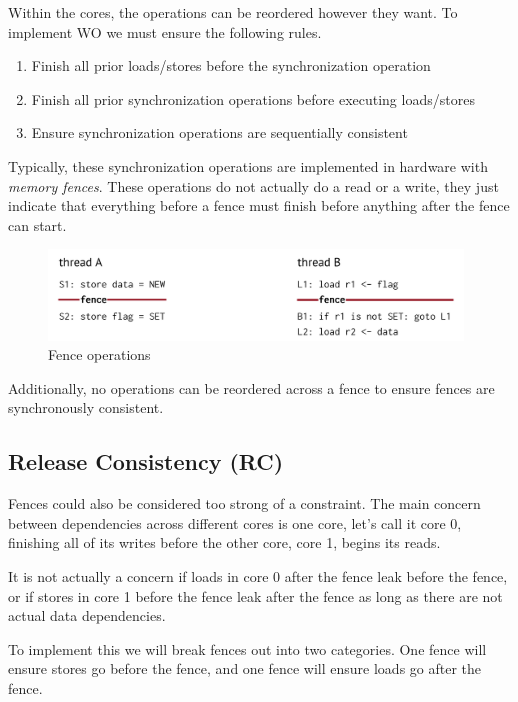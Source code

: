 \documentclass{article}
\begin{document}
Within the cores, the operations can be reordered however they want. To implement WO we must ensure the following rules.

\begin{enumerate}
\item Finish all prior loads/stores before the synchronization operation

\item Finish all prior synchronization operations before executing loads/stores

\item Ensure synchronization operations are sequentially consistent
\end{enumerate}

Typically, these synchronization operations are implemented in hardware with \textit{memory fences}. These operations do not actually do a read or a write, they just indicate that everything before a fence must finish before anything after the fence can start.


\begin{figure}[ht!]
\centering
\includegraphics[width=110mm]{img/fence.png}
\caption{Fence operations}
\end{figure}

 Additionally, no operations can be reordered across a fence to ensure fences are synchronously consistent.

\subsection{Release Consistency (RC)} 
 
 Fences could also be considered too strong of a constraint. The main concern between dependencies across different cores is one core, let's call it core 0, finishing all of its writes before the other core, core 1, begins its reads. 
 
 It is not actually a concern if loads in core 0 after the fence leak before the fence, or if stores in core 1 before the fence leak after the fence as long as there are not actual data dependencies. 
 
 To implement this we will break fences out into two categories. One fence will ensure stores go before the fence, and one fence will ensure loads go after the fence. 
 
\end{document}
